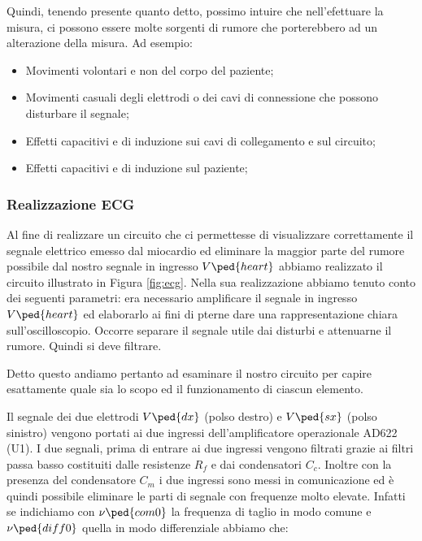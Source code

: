 Quindi, tenendo presente quanto detto, possimo intuire che nell'efettuare la misura, ci possono essere molte sorgenti di rumore che porterebbero ad un alterazione della misura. Ad esempio:

\begin{itemize} \itemsep0pt \parskip0pt 
	\item{Movimenti volontari e non del corpo del paziente;}
	\item{Movimenti casuali degli elettrodi o dei cavi di connessione che possono disturbare il segnale;}
	\item{Effetti capacitivi e di induzione sui cavi di collegamento e sul circuito;}
	\item{Effetti capacitivi e di induzione sul paziente;}
\end{itemize}

\subsubsection*{Realizzazione ECG}

Al fine di realizzare un circuito che ci permettesse di visualizzare correttamente il segnale elettrico emesso dal miocardio ed eliminare la maggior parte del rumore possibile dal nostro segnale in ingresso $V\ped{heart}$ abbiamo realizzato il circuito illustrato in Figura \ref{fig:ecg}.
Nella sua realizzazione abbiamo tenuto conto dei seguenti parametri: era necessario amplificare il segnale in ingresso $V\ped{heart}$ ed elaborarlo ai fini di pterne dare una rappresentazione chiara sull'oscilloscopio. Occorre separare il segnale utile dai disturbi e attenuarne il rumore. Quindi si deve filtrare.

Detto questo andiamo pertanto ad esaminare il nostro circuito per capire esattamente quale sia lo scopo ed il funzionamento di ciascun elemento.

Il segnale dei due elettrodi $V\ped{dx}$ (polso destro) e $V\ped{sx}$ (polso sinistro) vengono portati ai due ingressi dell'amplificatore operazionale AD622 (U1). I due segnali, prima di entrare ai due ingressi vengono filtrati grazie ai filtri passa basso costituiti dalle resistenze $R_f$ e dai condensatori $C_c$. Inoltre con la presenza del condensatore $C_m$ i due ingressi sono messi in comunicazione ed è quindi possibile eliminare le parti di segnale con frequenze molto elevate. Infatti se indichiamo con $\nu\ped{com0}$ la frequenza di taglio in modo comune e $\nu\ped{diff0}$ quella in modo differenziale abbiamo che:

